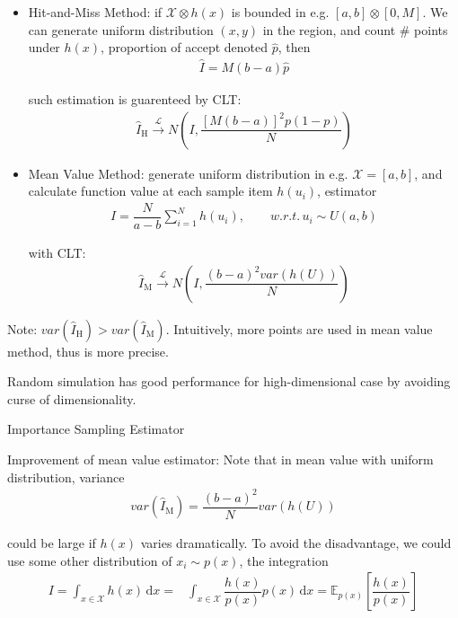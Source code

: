 \begin{itemize}[topsep=2pt,itemsep=0pt]
    \item Hit-and-Miss Method: if $ \mathcal{X}\otimes h(x) $ is bounded in e.g. $ [a,b]\otimes [0,M] $. We can generate uniform distribution $ (x,y) $ in the region, and count \# points under $ h(x) $, proportion of accept denoted $ \hat{p} $, then
    \begin{align}
        \hat{I}=M(b-a)\hat{p} 
    \end{align}

    such estimation is guarenteed by CLT:
    \begin{align}
        \hat{I}_\mathrm{H} \xrightarrow[]{\mathscr{L}} N\left( I,\dfrac{[M(b-a)]^2p(1-p)}{N} \right)
    \end{align}
    
    
    \item Mean Value Method: generate uniform distribution in e.g. $ \mathcal{X}=[a,b] $, and calculate function value at each sample item $ h(u_i) $, estimator
    \begin{align}
        \hat{I}=\dfrac{N}{a-b}\sum_{i=1}^Nh(u_i) ,\qquad w.r.t.\, u_i\sim U(a,b)
    \end{align}
    
    with CLT:
    \begin{align}
         \hat{I}_\mathrm{M} \xrightarrow[]{\mathscr{L}} N\left(I,\dfrac{(b-a)^2var(h(U))}{N}\right)
    \end{align}


\end{itemize}

    Note: $ var(\hat{I}_\mathrm{H} )>var(\hat{I}_\mathrm{M} ) $. Intuitively, more points are used in mean value method, thus is more precise.

    Random simulation has good performance for high-dimensional case by avoiding curse of dimensionality.

\begin{point}
    Importance Sampling Estimator
\end{point}

    Improvement of mean value estimator: Note that in mean value with uniform distribution, variance
    \begin{align}
        var(\hat{I}_\mathrm{M}) =\dfrac{(b-a)^2}{N}var(h(U))
    \end{align}

    could be large if $ h(x) $ varies dramatically. To avoid the disadvantage, we could use some other distribution of $ x_i\sim p(x) $, the integration
    \begin{align}
        I=\int_{x\in \mathcal{X} } h(x) \,\mathrm{d}x =&\int _{x\in \mathcal{X}} \dfrac{h(x)}{p(x)}p(x) \,\mathrm{d}x=\mathbb{E}_{p(x)}\left[\dfrac{h(x)}{p(x)}\right]
    \end{align}

